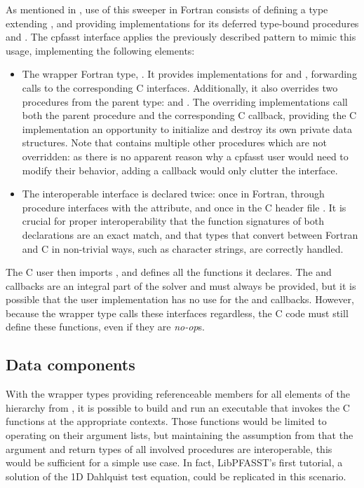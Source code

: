 As mentioned in , use of this sweeper in Fortran consists of defining a type extending , and providing implementations
for its deferred type-bound procedures  and . The cpfasst interface applies the previously described pattern to mimic this usage, implementing the
following elements:
\begin{itemize}
    \item The wrapper Fortran type, . It provides implementations for  and , forwarding calls to the corresponding C
    interfaces. Additionally, it also overrides two procedures from the parent type:  and . The overriding implementations call both the parent procedure and the corresponding C callback, providing the C implementation an opportunity to initialize and destroy its own private data structures. Note that  contains multiple other procedures which are not overridden: as there is no apparent reason why a cpfasst user would need to modify their behavior,
    adding a callback would only clutter the interface.
    \item The interoperable interface is declared twice: once in Fortran, through procedure interfaces with the  attribute, and once in the C header file 
    . It is crucial for proper interoperability that the function signatures of both declarations are an exact match, and that types that
    convert between Fortran and C in non-trivial ways, such as character strings, are correctly handled.
\end{itemize}
The C user then imports , and defines all the functions it declares. The  and  callbacks are an integral part of the solver
and must always be provided, but it is possible that the user implementation has no use for the  and  callbacks. However, because the
wrapper type calls these interfaces regardless, the C code must still define these functions, even if they are \textit{no-op}s.

\subsection{Data components} \label{sec:impl_data}

With the wrapper types providing referenceable members for all elements of the hierarchy from , it is possible to build and run an executable that invokes the C functions at the appropriate contexts. Those functions would be limited to operating on their argument lists, but maintaining the assumption from  that the argument and return types of all involved procedures are interoperable, this would be sufficient for a simple use case. In fact, LibPFASST's first tutorial, a solution of the 1D Dahlquist test equation, could be replicated in this scenario.

